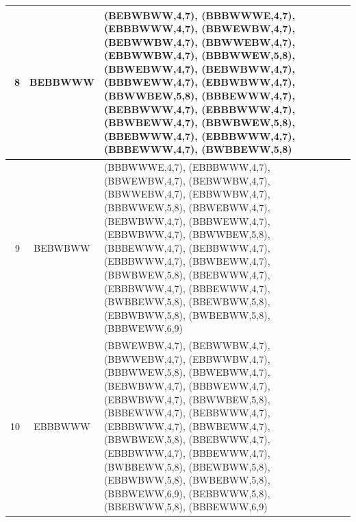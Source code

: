 \documentclass[10pt]{article}
\begin{document}
\begin{enumerate}
\begin{enumerate}
\begin{longtable}[t]{|r|c|p{20em}|}
    \hline
    8    & BEBBWWW & (BEBWBWW,4,7), (BBBWWWE,4,7), (EBBBWWW,4,7), (BBWEWBW,4,7),
                     (BEBWWBW,4,7), (BBWWEBW,4,7), (EBBWWBW,4,7), (BBBWWEW,5,8),
                     (BBWEBWW,4,7), (BEBWBWW,4,7), (BBBWEWW,4,7), (EBBWBWW,4,7),
                     (BBWWBEW,5,8), (BBBEWWW,4,7), (BEBBWWW,4,7), (EBBBWWW,4,7),
                     (BBWBEWW,4,7), (BBWBWEW,5,8), (BBEBWWW,4,7), (EBBBWWW,4,7),
                     (BBBEWWW,4,7), (BWBBEWW,5,8) \\
    \hline
    9    & BEBWBWW & (BBBWWWE,4,7), (EBBBWWW,4,7), (BBWEWBW,4,7),
                     (BEBWWBW,4,7), (BBWWEBW,4,7), (EBBWWBW,4,7), (BBBWWEW,5,8),
                     (BBWEBWW,4,7), (BEBWBWW,4,7), (BBBWEWW,4,7), (EBBWBWW,4,7),
                     (BBWWBEW,5,8), (BBBEWWW,4,7), (BEBBWWW,4,7), (EBBBWWW,4,7),
                     (BBWBEWW,4,7), (BBWBWEW,5,8), (BBEBWWW,4,7), (EBBBWWW,4,7),
                     (BBBEWWW,4,7), (BWBBEWW,5,8), (BBEWBWW,5,8), (EBBWBWW,5,8),
                     (BWBEBWW,5,8), (BBBWEWW,6,9) \\
    \hline
    10   & EBBBWWW & (BBWEWBW,4,7), (BEBWWBW,4,7), (BBWWEBW,4,7), 
                     (EBBWWBW,4,7),
                     (BBBWWEW,5,8), (BBWEBWW,4,7), (BEBWBWW,4,7), (BBBWEWW,4,7),
                     (EBBWBWW,4,7), (BBWWBEW,5,8), (BBBEWWW,4,7), (BEBBWWW,4,7),
                     (EBBBWWW,4,7), (BBWBEWW,4,7), (BBWBWEW,5,8), (BBEBWWW,4,7),
                     (EBBBWWW,4,7), (BBBEWWW,4,7), (BWBBEWW,5,8), (BBEWBWW,5,8),
                     (EBBWBWW,5,8), (BWBEBWW,5,8), (BBBWEWW,6,9), (BEBBWWW,5,8),
                     (BBEBWWW,5,8), (BBBEWWW,6,9) \\
    \hline
    \end{longtable}
  \end{enumerate}

\end{enumerate}
\end{document}
